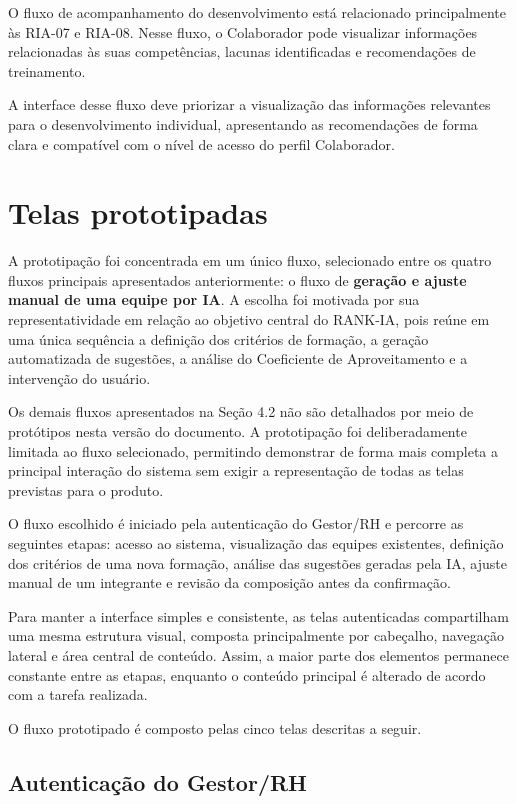 \documentclass[a4paper,12pt,oneside,openany]{book}
\begin{document}
O fluxo de acompanhamento do desenvolvimento está relacionado principalmente às RIA-07 e RIA-08. Nesse fluxo, o Colaborador pode visualizar informações relacionadas às suas competências, lacunas identificadas e recomendações de treinamento.

A interface desse fluxo deve priorizar a visualização das informações relevantes para o desenvolvimento individual, apresentando as recomendações de forma clara e compatível com o nível de acesso do perfil Colaborador.

\section{Telas prototipadas}

A prototipação foi concentrada em um único fluxo, selecionado entre os quatro fluxos principais apresentados anteriormente: o fluxo de \textbf{geração e ajuste manual de uma equipe por IA}. A escolha foi motivada por sua representatividade em relação ao objetivo central do RANK-IA, pois reúne em uma única sequência a definição dos critérios de formação, a geração automatizada de sugestões, a análise do Coeficiente de Aproveitamento e a intervenção do usuário.

Os demais fluxos apresentados na Seção 4.2 não são detalhados por meio de protótipos nesta versão do documento. A prototipação foi deliberadamente limitada ao fluxo selecionado, permitindo demonstrar de forma mais completa a principal interação do sistema sem exigir a representação de todas as telas previstas para o produto.

O fluxo escolhido é iniciado pela autenticação do Gestor/RH e percorre as seguintes etapas: acesso ao sistema, visualização das equipes existentes, definição dos critérios de uma nova formação, análise das sugestões geradas pela IA, ajuste manual de um integrante e revisão da composição antes da confirmação.

Para manter a interface simples e consistente, as telas autenticadas compartilham uma mesma estrutura visual, composta principalmente por cabeçalho, navegação lateral e área central de conteúdo. Assim, a maior parte dos elementos permanece constante entre as etapas, enquanto o conteúdo principal é alterado de acordo com a tarefa realizada.

O fluxo prototipado é composto pelas cinco telas descritas a seguir.

\subsection{Autenticação do Gestor/RH}
\end{document}
